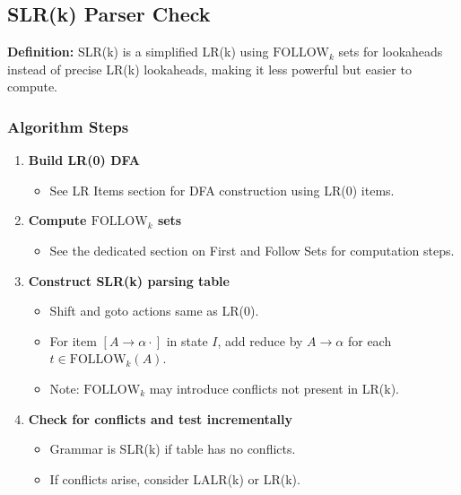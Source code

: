 \subsection{SLR(k) Parser Check}

\textbf{Definition:} SLR(k) is a simplified LR(k) using \(\text{FOLLOW}_k\) sets for lookaheads instead of precise LR(k) lookaheads, making it less powerful but easier to compute.

\subsubsection{Algorithm Steps}

\begin{enumerate}
    \item \textbf{Build LR(0) DFA}
    \begin{itemize}
        \item See LR Items section for DFA construction using LR(0) items.
    \end{itemize}

    \item \textbf{Compute \(\text{FOLLOW}_k\) sets}
    \begin{itemize}
        \item See the dedicated section on First and Follow Sets for computation steps.
    \end{itemize}

    \item \textbf{Construct SLR(k) parsing table}
    \begin{itemize}
        \item Shift and goto actions same as LR(0).
        \item For item \( [A \to \alpha \cdot] \) in state \( I \), add reduce by \( A \to \alpha \) for each \( t \in \text{FOLLOW}_k(A) \).
        \item Note: \(\text{FOLLOW}_k\) may introduce conflicts not present in LR(k).
    \end{itemize}

    \item \textbf{Check for conflicts and test incrementally}
    \begin{itemize}
        \item Grammar is SLR(k) if table has no conflicts.
        \item If conflicts arise, consider LALR(k) or LR(k).
    \end{itemize}
\end{enumerate}

